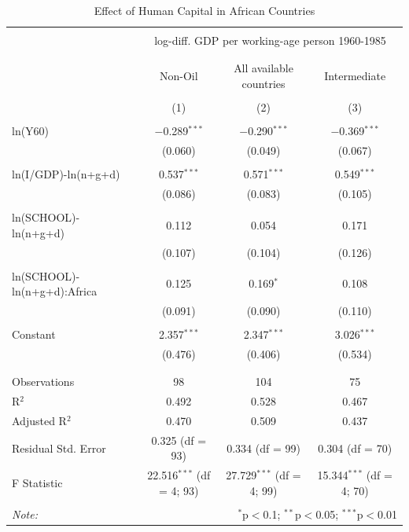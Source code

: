 \documentclass[a4paper,11pt]{article}
\begin{document}
\begin{table}[!htbp] \centering 
  \caption{Effect of Human Capital in African Countries} 
  \label{tab:HumanCap} 
\begin{tabular}{@{\extracolsep{5pt}}lccc} 
\\[-1.8ex]\hline 
\hline \\[-1.8ex] 
 & \multicolumn{3}{c}{log-diff. GDP per working-age person 1960-1985} \\ 
\cline{2-4} 
\\[-1.8ex] & \multicolumn{3}{c}{} \\ 
 & Non-Oil & All available countries & Intermediate \\ 
\\[-1.8ex] & (1) & (2) & (3)\\ 
\hline \\[-1.8ex] 
 ln(Y60)& $-$0.289$^{***}$ & $-$0.290$^{***}$ & $-$0.369$^{***}$ \\ 
  & (0.060) & (0.049) & (0.067) \\ 
  & & & \\ 
  ln(I/GDP)-ln(n+g+d) & 0.537$^{***}$ & 0.571$^{***}$ & 0.549$^{***}$ \\ 
  & (0.086) & (0.083) & (0.105) \\ 
  & & & \\ 
  ln(SCHOOL)-ln(n+g+d) & 0.112 & 0.054 & 0.171 \\ 
  & (0.107) & (0.104) & (0.126) \\ 
  & & & \\ 
  ln(SCHOOL)-ln(n+g+d):Africa & 0.125 & 0.169$^{*}$ & 0.108 \\ 
  & (0.091) & (0.090) & (0.110) \\ 
  & & & \\ 
 Constant & 2.357$^{***}$ & 2.347$^{***}$ & 3.026$^{***}$ \\ 
  & (0.476) & (0.406) & (0.534) \\ 
  & & & \\ 
\hline \\[-1.8ex] 
Observations & 98 & 104 & 75 \\ 
R$^{2}$ & 0.492 & 0.528 & 0.467 \\ 
Adjusted R$^{2}$ & 0.470 & 0.509 & 0.437 \\ 
Residual Std. Error & 0.325 (df = 93) & 0.334 (df = 99) & 0.304 (df = 70) \\ 
F Statistic & 22.516$^{***}$ (df = 4; 93) & 27.729$^{***}$ (df = 4; 99) & 15.344$^{***}$ (df = 4; 70) \\ 
\hline 
\hline \\[-1.8ex] 
\textit{Note:}  & \multicolumn{3}{r}{$^{*}$p$<$0.1; $^{**}$p$<$0.05; $^{***}$p$<$0.01} \\ 
\end{tabular} 
\end{table}
\end{document}
